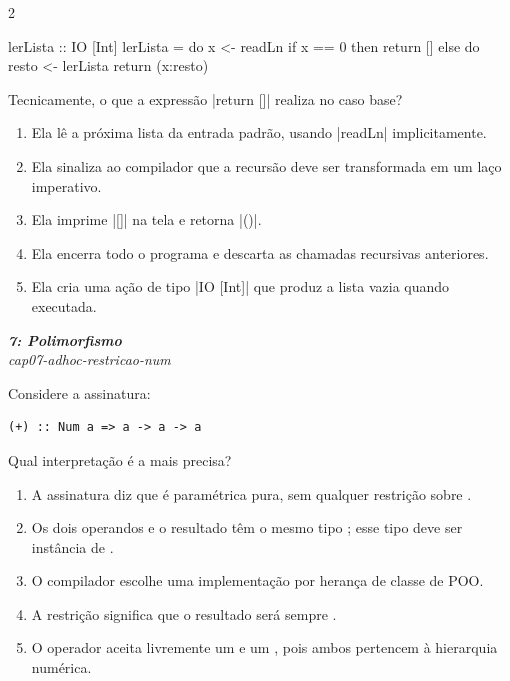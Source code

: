 \documentclass[a4paper,10pt,brazil]{article}
\begin{document}
\begin{multicols}{2}
\begin{haskellcode}
lerLista :: IO [Int]
lerLista = do
  x <- readLn
  if x == 0
    then return []
    else do
      resto <- lerLista
      return (x:resto)
\end{haskellcode}

Tecnicamente, o que a expressão \haskellinline|return []| realiza no caso base?

\begin{enumerate}
  \item Ela lê a próxima lista da entrada padrão, usando \haskellinline|readLn| implicitamente.

  \item Ela sinaliza ao compilador que a recursão deve ser transformada em um laço imperativo.

  \item Ela imprime \haskellinline|[]| na tela e retorna \haskellinline|()|.

  \item Ela encerra todo o programa e descarta as chamadas recursivas anteriores.

  \item Ela cria uma ação de tipo \haskellinline|IO [Int]| que produz a lista vazia quando executada.


\end{enumerate}

\begin{flushright}
  \footnotesize
  \textit{\textbf{7: Polimorfismo}}\\
  \textit{cap07-adhoc-restricao-num}\\

\end{flushright}
Considere a assinatura:

\begin{verbatim}
(+) :: Num a => a -> a -> a
\end{verbatim}

Qual interpretação é a mais precisa?

\begin{enumerate}
  \item A assinatura diz que \haskellinline{(+)} é paramétrica pura, sem qualquer restrição sobre .
  \item Os dois operandos e o resultado têm o mesmo tipo ; esse tipo deve ser instância de .
  \item O compilador escolhe uma implementação por herança de classe de POO.
  \item A restrição  significa que o resultado será sempre .
  \item O operador aceita livremente um  e um , pois ambos pertencem à hierarquia numérica.


\end{enumerate}
\end{multicols}
\end{document}
